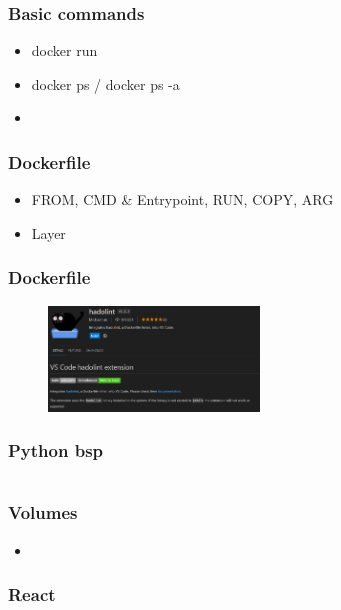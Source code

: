\documentclass[22pt]{beamer}
\begin{document}
\begin{frame}[t]
    \frametitle{Basic commands}
    \begin{itemize}
        \item docker run
        \item docker ps / docker ps -a
        \item 
    \end{itemize} 
\end{frame}

\begin{frame}[t]
    \frametitle{Dockerfile}
    \begin{itemize}
        \item FROM, CMD \& Entrypoint, RUN, COPY, ARG
        \item Layer
    \end{itemize} 
\end{frame}

\begin{frame}[t]
    \frametitle{Dockerfile}
    \begin{figure}[h]
        \centering
        \includegraphics[width=0.5\textwidth]{Hadolint.png}
        \caption{}
    \end{figure}
\end{frame}



\begin{frame}[fragile]
    \frametitle{Python bsp}
    \inputminted[fontsize=\footnotesize, frame=lines]{dockerfile}{../examples/Dockerfile.cmd}
\end{frame}

\begin{frame}[t]
    \frametitle{Volumes}
    \begin{itemize}
        \item 
    \end{itemize} 
\end{frame}

\begin{frame}[fragile]
    \frametitle{React}
    \inputminted[fontsize=\footnotesize, frame=lines]{dockerfile}{../examples/Dockerfile.cmd}
\end{frame}
\end{document}
